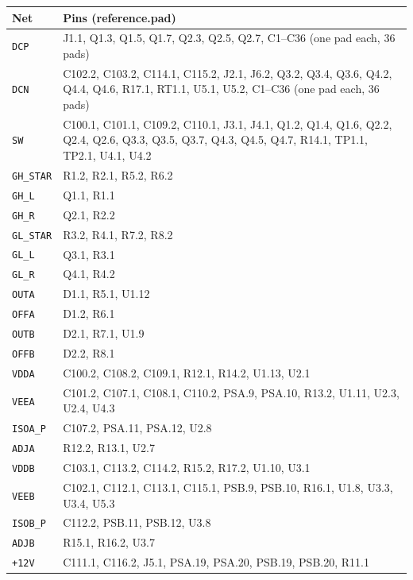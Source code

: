 \begin{longtable}{@{}lp{}@{}}
\toprule Net & Pins (reference.pad) \\ \midrule \endhead
\texttt{DCP} & \small J1.1, Q1.3, Q1.5, Q1.7, Q2.3, Q2.5, Q2.7, C1--C36 (one pad each, 36 pads) \\
\texttt{DCN} & \small C102.2, C103.2, C114.1, C115.2, J2.1, J6.2, Q3.2, Q3.4, Q3.6, Q4.2, Q4.4, Q4.6, R17.1, RT1.1, U5.1, U5.2, C1--C36 (one pad each, 36 pads) \\
\texttt{SW} & \small C100.1, C101.1, C109.2, C110.1, J3.1, J4.1, Q1.2, Q1.4, Q1.6, Q2.2, Q2.4, Q2.6, Q3.3, Q3.5, Q3.7, Q4.3, Q4.5, Q4.7, R14.1, TP1.1, TP2.1, U4.1, U4.2 \\
\texttt{GH\_STAR} & \small R1.2, R2.1, R5.2, R6.2 \\
\texttt{GH\_L} & \small Q1.1, R1.1 \\
\texttt{GH\_R} & \small Q2.1, R2.2 \\
\texttt{GL\_STAR} & \small R3.2, R4.1, R7.2, R8.2 \\
\texttt{GL\_L} & \small Q3.1, R3.1 \\
\texttt{GL\_R} & \small Q4.1, R4.2 \\
\texttt{OUTA} & \small D1.1, R5.1, U1.12 \\
\texttt{OFFA} & \small D1.2, R6.1 \\
\texttt{OUTB} & \small D2.1, R7.1, U1.9 \\
\texttt{OFFB} & \small D2.2, R8.1 \\
\texttt{VDDA} & \small C100.2, C108.2, C109.1, R12.1, R14.2, U1.13, U2.1 \\
\texttt{VEEA} & \small C101.2, C107.1, C108.1, C110.2, PSA.9, PSA.10, R13.2, U1.11, U2.3, U2.4, U4.3 \\
\texttt{ISOA\_P} & \small C107.2, PSA.11, PSA.12, U2.8 \\
\texttt{ADJA} & \small R12.2, R13.1, U2.7 \\
\texttt{VDDB} & \small C103.1, C113.2, C114.2, R15.2, R17.2, U1.10, U3.1 \\
\texttt{VEEB} & \small C102.1, C112.1, C113.1, C115.1, PSB.9, PSB.10, R16.1, U1.8, U3.3, U3.4, U5.3 \\
\texttt{ISOB\_P} & \small C112.2, PSB.11, PSB.12, U3.8 \\
\texttt{ADJB} & \small R15.1, R16.2, U3.7 \\
\texttt{+12V} & \small C111.1, C116.2, J5.1, PSA.19, PSA.20, PSB.19, PSB.20, R11.1 \\

\end{longtable}
